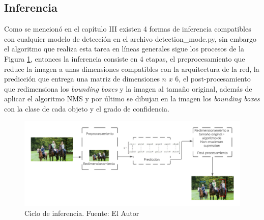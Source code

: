 \subsection{Inferencia}
Como se mencionó en el capítulo III existen 4 formas de inferencia compatibles con cualquier modelo de detección en el archivo detection\_mode.py, sin embargo el algoritmo que realiza esta tarea en líneas generales sigue los procesos de la Figura \ref{inference_diagram}, entonces la inferencia consiste en 4 etapas, el preprocesamiento que reduce la imagen a unas dimensiones compatibles con la arquitectura de la red, la predicción que entrega una matriz de dimensiones $n$ $x$ $6$, el post-procesamiento que redimensiona los \textit{bounding boxes} y la imagen al tamaño original, además de aplicar el algoritmo NMS y por último se dibujan en la imagen los \textit{bounding boxes} con la clase de cada objeto y el grado de confidencia.
\begin{figure}[H]
    \centering
    \includegraphics[scale=0.6]{Recursos/inference_cycle.png}
    \caption[Ciclo de inferencia.]{Ciclo de inferencia. {\footnotesize Fuente: El Autor}}
    \label{inference_diagram}
\end{figure}
